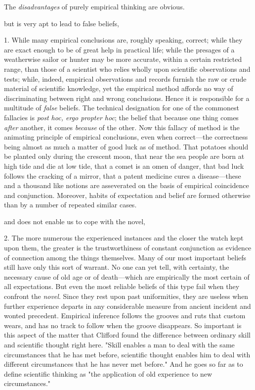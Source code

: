 \documentclass[letterpaper]{book}
\begin{document}
The \emph{disadvantages} of purely empirical thinking are
obvious.

but is very apt to lead to false beliefs,

1. While many empirical conclusions are, roughly speaking, correct;
while they are exact enough to be of great help in practical life; while
the presages of a weatherwise sailor or hunter may be more accurate,
within a certain restricted range, than those of a scientist who relies
wholly upon scientific observations and tests; while, indeed, empirical
observations and records furnish the raw or crude material of scientific
knowledge, yet the empirical method affords no way of discriminating
between right and wrong conclusions. Hence it is responsible for a
multitude of \emph{false} beliefs. The technical designation for one of
the commonest fallacies is \emph{post hoc, ergo propter hoc}; the belief
that because one thing comes \emph{after} another, it comes
\emph{because} of the other. Now this fallacy of method is the animating
principle of empirical conclusions, even when correct---the correctness
being almost as much a matter of good luck as of method. That potatoes
should be planted only during the crescent moon, that near the sea
people are born at high tide and die at low tide, that a comet is an
omen of danger, that bad luck follows the cracking of a mirror, that a
patent medicine cures a disease---these and a thousand like notions are
asseverated on the basis of empirical coincidence and conjunction.
Moreover, habits of expectation and belief are formed otherwise than by
a number of repeated similar cases.

and does not enable us to cope with the novel,

2. The more numerous the experienced instances and the closer the watch
kept upon them, the greater is the trustworthiness of constant
conjunction as evidence of connection among the things themselves. Many
of our most important beliefs still have only this sort of warrant. No
one can yet tell, with certainty, the
necessary
cause of old age or of death---which are empirically the most certain of
all expectations. But even the most reliable beliefs of this type fail
when they confront the \emph{novel}. Since they rest upon past
uniformities, they are useless when further experience departs in any
considerable measure from ancient incident and wonted precedent.
Empirical inference follows the grooves and ruts that custom wears, and
has no track to follow when the groove disappears. So important is this
aspect of the matter that Clifford found the difference between ordinary
skill and scientific thought right here. "Skill enables a man to deal
with the same circumstances that he has met before, scientific thought
enables him to deal with different circumstances that he has never met
before." And he goes so far as to define scientific thinking as "the
application of old experience to new circumstances."
\end{document}

